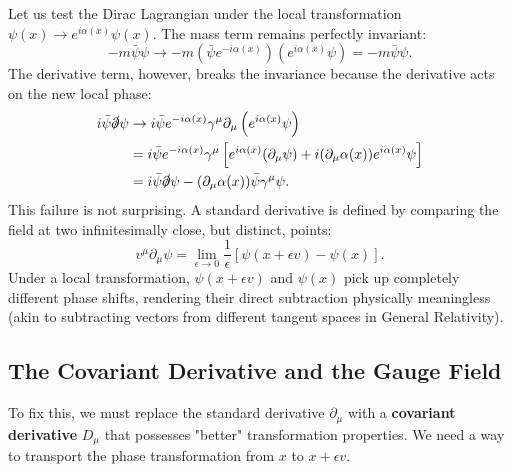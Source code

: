 Let us test the Dirac Lagrangian under the local transformation $\psi(x) \to e^{i\alpha(x)}\psi(x)$.
The mass term remains perfectly invariant:
\[
    -m\bar{\psi}\psi \to -m\left(\bar{\psi}e^{-i\alpha(x)}\right)\left(e^{i\alpha(x)}\psi\right) = -m\bar{\psi}\psi.
\]
The derivative term, however, breaks the invariance because the derivative acts on the new local phase:
\[
    \begin{aligned}
        i\bar{\psi}\slashed{\partial}\psi & \to i\bar{\psi}e^{-i\alpha(x)} \gamma^\mu \partial_\mu \left(e^{i\alpha(x)}\psi\right)                                                 \\
                                          & = i\bar{\psi}e^{-i\alpha(x)} \gamma^\mu \left[ e^{i\alpha(x)}(\partial_\mu \psi) + i(\partial_\mu \alpha(x))e^{i\alpha(x)}\psi \right] \\
                                          & = i\bar{\psi}\slashed{\partial}\psi - (\partial_\mu \alpha(x))\bar{\psi}\gamma^\mu\psi.
    \end{aligned}
\]
This failure is not surprising. A standard derivative is defined by comparing the field at two infinitesimally close, but distinct, points:
\[
    v^\mu \partial_\mu \psi = \lim_{\epsilon \to 0} \frac{1}{\epsilon} [\psi(x+\epsilon v) - \psi(x)].
\]
Under a local transformation, $\psi(x+\epsilon v)$ and $\psi(x)$ pick up completely different phase shifts, rendering their direct subtraction physically meaningless (akin to subtracting vectors from different tangent spaces in General Relativity).

\subsection{The Covariant Derivative and the Gauge Field}
To fix this, we must replace the standard derivative $\partial_\mu$ with a \textbf{covariant derivative} $D_\mu$ that possesses "better" transformation properties. We need a way to transport the phase transformation from $x$ to $x+\epsilon v$.

